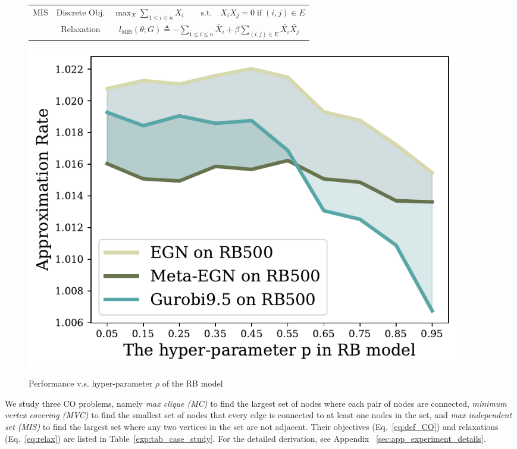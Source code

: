 \begin{figure}
\begin{minipage}{0.63\textwidth}
{\begin{tabular}{@{}ccc@{}}
\multirow{2.5}{*}{MIS} & Discrete Obj. & $\max_{X} \sum_{1 \leq i \leq n} X_i \quad \quad \text{s.t.} \quad  X_iX_j = 0 \;\text{if}\; (i,j) \in E$ \\ \cmidrule(l){2-3} 

 & Relaxation & $l_{\text{MIS}}(\theta;G) \triangleq -\sum_{1 \leq i \leq n} \bar{X}_i + \beta \sum_{(i,j) \in E} \bar{X_i} \bar{X_j}$ \\ \bottomrule
\end{tabular}}
\end{minipage}
\hfill
\begin{minipage}{0.34\textwidth}
\caption{Performance v.s. hyper-parameter $\rho$ of the RB model}
\vspace{-0.1cm}
\includegraphics[width=0.92\textwidth]{iclr2023/img/exp/difficulty_mvc.pdf}
\vspace{-0.5cm}
\label{fig:difficulty_rb}
\end{minipage}
\end{figure}

We study three CO problems, namely \emph{max clique (MC)} to find the largest set of nodes where each pair of nodes are connected,  \emph{minimum vertex covering (MVC)} to find the smallest set of nodes that every edge is connected to at least one nodes in the set, and  \emph{max independent set (MIS)} to find the largest set where any two vertices in the set are not adjacent. Their objectives (Eq.~\ref{eq:def_CO}) and relaxations (Eq.~\ref{eq:relax})  are listed in Table~\ref{exp:tab_case_study}. For the detailed derivation, see Appendix ~\ref{sec:app_experiment_details}.

